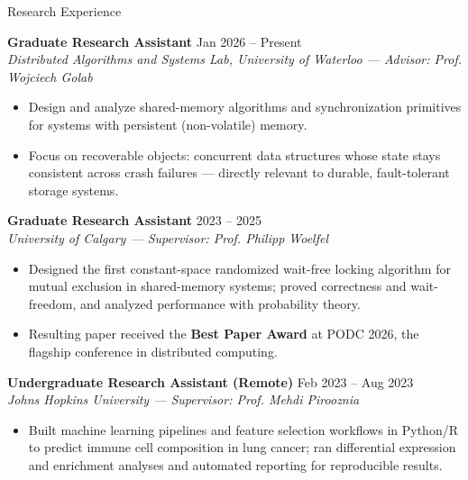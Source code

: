 \documentclass{resume}
\newenvironment{rItems}{%
  \begin{itemize}[leftmargin=1.1em, itemsep=0.05em, topsep=0.15em, parsep=0em, label=$\cdot$]%
}{\end{itemize}\vspace{0.2em}}
\begin{document}
\begin{rSection}{Research Experience}

{\bf Graduate Research Assistant} \hfill {Jan 2026 -- Present} \\
{\em Distributed Algorithms and Systems Lab, University of Waterloo --- Advisor: Prof. Wojciech Golab}
\begin{rItems}
  \item Design and analyze shared-memory algorithms and synchronization primitives for systems with persistent (non-volatile) memory.
  \item Focus on recoverable objects: concurrent data structures whose state stays consistent across crash failures --- directly relevant to durable, fault-tolerant storage systems.
\end{rItems}

{\bf Graduate Research Assistant} \hfill {2023 -- 2025} \\
{\em University of Calgary --- Supervisor: Prof. Philipp Woelfel}
\begin{rItems}
  \item Designed the first constant-space randomized wait-free locking algorithm for mutual exclusion in shared-memory systems; proved correctness and wait-freedom, and analyzed performance with probability theory.
  \item Resulting paper received the {\bf Best Paper Award} at PODC 2026, the flagship conference in distributed computing.
\end{rItems}

{\bf Undergraduate Research Assistant (Remote)} \hfill {Feb 2023 -- Aug 2023} \\
{\em Johns Hopkins University --- Supervisor: Prof. Mehdi Pirooznia}
\begin{rItems}
  \item Built machine learning pipelines and feature selection workflows in Python/R to predict immune cell composition in lung cancer; ran differential expression and enrichment analyses and automated reporting for reproducible results.
\end{rItems}


\end{rSection}
\end{document}
